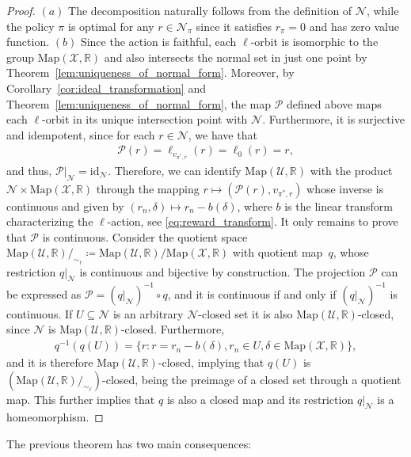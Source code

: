 \documentclass[10pt,leqno]{amsart}
\newcommand{\sml}{\scriptscriptstyle}
\newcommand{\id}[1]{\text{id}_{\sml #1}}
\newcommand{\R}{\mathbb{R}}
\newcommand{\U}{\mathcal{U}}
\newcommand{\X}{\mathcal{X}}
\newcommand{\cost}{r}
\newcommand{\vvarg}[1]{v_{#1}}
\newcommand{\policy}{\pi}
\newcommand{\lintransf}{b}
\newcommand{\maps}{\text{Map}}
\newcommand{\actAdvsym}{\ell}
\newcommand{\actAdv}[1]{\actAdvsym_{#1}}
\newcommand{\normset}{\mathcal{N}}
\begin{document}
\begin{proof}
    $(a)$ The decomposition naturally follows from the definition of $\normset$, while the policy $\policy$ is optimal for any $\cost \in \normset_{\policy}$ since it satisfies $\cost_{\policy} = 0$ and has zero value function.\newline
    $(b)$ Since the action is faithful, each $\actAdvsym$-orbit is isomorphic to the group $\maps(\X, \R)$ and also intersects the normal set in just one point by Theorem~\ref{lem:uniqueness_of_normal_form}. Moreover, by Corollary~\ref{cor:ideal_transformation} and Theorem~\ref{lem:uniqueness_of_normal_form}, the map $\mathcal{P}$ defined above maps each $\actAdvsym$-orbit in its unique intersection point with $\normset$.
    Furthermore, it is surjective and idempotent, since for each $\cost \in \normset$, we have that
    \begin{align*}
        \mathcal{P}(\cost) = \actAdv{\vvarg{\policy^*\!,\cost}}(\cost) = \actAdv{0}(\cost) = \cost,
    \end{align*}
    and thus, $\mathcal{P}\rvert_{\normset} = \id{\normset}$. Therefore, we can identify $\maps(\U, \R)$ with the product $\normset\times \maps(\X, \R)$ through the mapping $\cost \mapsto \left( \mathcal{P}(\cost), \vvarg{\policy^*\!, \cost} \right)$ whose inverse is continuous and given by $(\cost_n, \delta) \mapsto \cost_n - \lintransf(\delta)$, where $\lintransf$ is the linear transform characterizing the $\actAdvsym$-action, see \eqref{eq:reward_transform}. It only remains to prove that $\mathcal{P}$ is continuous. Consider the quotient space $\maps(\U, \R)/_{\sim_{\actAdvsym}} \coloneqq \maps(\U, \R)/\maps(\X, \R)$ with quotient map~$q$, whose restriction $q\rvert_{\normset}$ is continuous and bijective by construction. The projection $\mathcal{P}$ can be expressed as $\mathcal{P} = (q\rvert_{\normset})^{-1} \circ q$, and it is continuous if and only if $(q\rvert_{\normset})^{-1}$ is continuous. %
    If $U \subseteq \normset$ is an arbitrary $\normset$-closed set it is also $\maps(\U, \R)$-closed, since $\normset$ is $\maps(\U, \R)$-closed. Furthermore,
    \begin{align*}
        q^{-1}(q(U)) = \{\cost : \cost = \cost_n - \lintransf(\delta), \cost_n \in U, \delta \in \maps(\X, \R)\},
    \end{align*}
    and it is therefore $\maps(\U, \R)$-closed, implying that $q(U)$ is $(\maps(\U, \R)/_{\sim_{\actAdvsym}})$-closed, being the preimage of a closed set through a quotient map. This further implies that $q$ is also a closed map and its restriction $q\rvert_{\normset}$ is a homeomorphism.
\end{proof}
\noindent The previous theorem has two main consequences:
\end{document}
